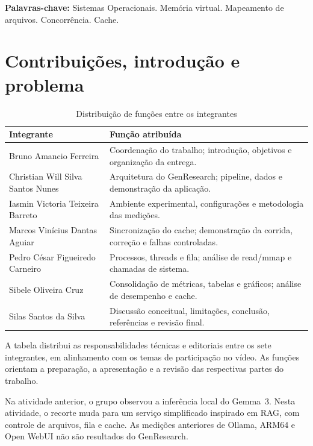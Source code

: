 \documentclass[12pt,a4paper]{article}
\newcommand{\secao}[1]{\clearpage\section{#1}}
\begin{document}
  \vspace{\baselineskip}
  \noindent\textbf{Palavras-chave:} Sistemas Operacionais. Memória virtual. Mapeamento de arquivos. Concorrência. Cache.
  
  \clearpage
  \thispagestyle{empty}
  \begin{singlespace}\small\tableofcontents\end{singlespace}
  
  \secao{Contribuições, introdução e problema}
  \begin{table}[H]
  \centering
  \caption{Distribuição de funções entre os integrantes}
  \label{tab:contribuicoes}
  \begin{singlespace}\small
  \begin{tabularx}{\textwidth}{>{\raggedright\arraybackslash}p{}X}
  \toprule\textbf{Integrante} & \textbf{Função atribuída}\\\midrule
  Bruno Amancio Ferreira & Coordenação do trabalho; introdução, objetivos e organização da entrega.\\
  Christian Will Silva Santos Nunes & Arquitetura do GenResearch; pipeline, dados e demonstração da aplicação.\\
  Iasmin Victoria Teixeira Barreto & Ambiente experimental, configurações e metodologia das medições.\\
  Marcos Vinícius Dantas Aguiar & Sincronização do cache; demonstração da corrida, correção e falhas controladas.\\
  Pedro César Figueiredo Carneiro & Processos, threads e fila; análise de read/mmap e chamadas de sistema.\\
  Sibele Oliveira Cruz & Consolidação de métricas, tabelas e gráficos; análise de desempenho e cache.\\
  Silas Santos da Silva & Discussão conceitual, limitações, conclusão, referências e revisão final.\\\bottomrule
  \end{tabularx}
  \end{singlespace}
  \end{table}
  A tabela distribui as responsabilidades técnicas e editoriais entre os sete integrantes, em alinhamento com os temas de participação no vídeo. As funções orientam a preparação, a apresentação e a revisão das respectivas partes do trabalho.
  
  Na atividade anterior, o grupo observou a inferência local do Gemma~3. Nesta atividade, o recorte muda para um serviço simplificado inspirado em RAG, com controle de arquivos, fila e cache. As medições anteriores de Ollama, ARM64 e Open WebUI não são resultados do GenResearch.
  
\end{document}

